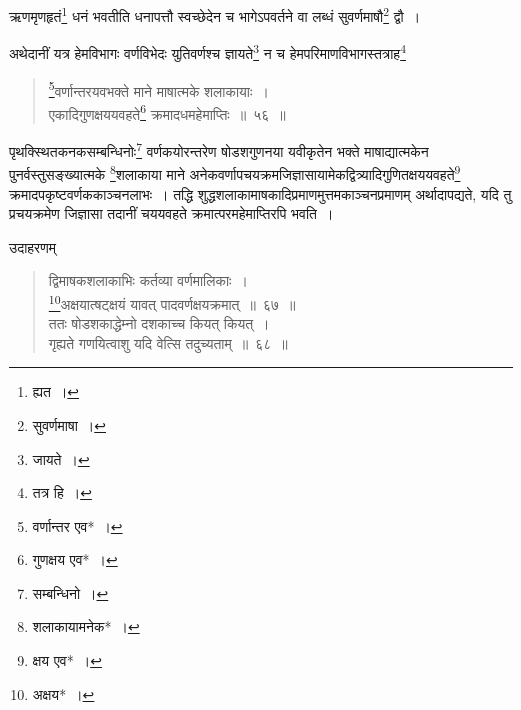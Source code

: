 \documentclass[10pt, openany]{book}
\begin{document}
{{\newpage

{ऋणमृणहृतं\renewcommand{\thefootnote}{\s ३}\footnote{\s *ह्यत~।} धनं भवतीति धनापत्तौ स्वच्छेदेन च भागेऽपवर्तने वा लब्धं
सुवर्णमाषौ\renewcommand{\thefootnote}{\s ४}\footnote{\s सुवर्णमाषा~।} द्वौ~।}
\vspace{3mm}

{अथेदानीं यत्र हेमविभागः वर्णविभेदः युतिवर्णश्च ज्ञायते\renewcommand{\thefootnote}{\s ५}\footnote{\s जायते~।} न च
हेमपरिमाणविभागस्तत्राह\renewcommand{\thefootnote}{\s ६}\footnote{\s तत्र हि~।}\textendash}

 \label{56}
\begin{quote}{\bs \renewcommand{\thefootnote}{\s ७}\footnote{\s वर्णान्तर एव*~।}वर्णान्तरयवभक्ते माने माषात्मके शलाकायाः~। \\
 एकादिगुणक्षययवहते\renewcommand{\thefootnote}{\s ८}\footnote{\s *गुणक्षय एव*~।} क्रमादधमहेमाप्तिः~॥~५६~॥}\end{quote}

{पृथक्स्थितकनकसम्बन्धिनोः\renewcommand{\thefootnote}{\s ९}\footnote{\s *सम्बन्धिनो~।} वर्णकयोरन्तरेण षोडशगुणनया यवीकृतेन भक्ते
माषाद्यात्मकेन पुनर्वस्तुसङ्ख्यात्मके \renewcommand{\thefootnote}{\s १०}\footnote{\s शलाकायामनेक*~।}शलाकाया माने
अनेकवर्णापचयक्रमजिज्ञासायामेकद्वित्र्यादिगुणितक्षययवहते\renewcommand{\thefootnote}{\s ११}\footnote{\s *क्षय एव*~।} क्रमादपकृष्टवर्णककाञ्चनलाभः~। तद्धि
शुद्धशलाकामाषकादिप्रमाणमुत्तमकाञ्चनप्रमाणम् अर्थादापद्यते, यदि तु प्रचयक्रमेण जिज्ञासा तदानीं चययवहते
क्रमात्परमहेमाप्तिरपि भवति~।}
\vspace{3mm}

{उदाहरणम्\textemdash}

\begin{quote}
    
{\eg द्विमाषकशलाकाभिः कर्तव्या वर्णमालिकाः~।\\
 \renewcommand{\thefootnote}{\s १२}\footnote{\s अक्षय*~।}अक्षयात्षट्क्षयं यावत् पादवर्णक्षयक्रमात्~॥~६७~॥ \\
 ततः षोडशकाद्धेम्नो दशकाच्च कियत् कियत्~। \\
 गृह्यते गणयित्वाशु यदि वेत्सि तदुच्यताम्~॥~६८~॥}\end{quote}

}}
\end{document}
